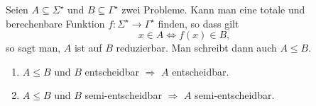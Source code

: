 Seien $A\subseteq \Sigma^\star$ und $B\subseteq \Gamma^\star$ zwei Probleme. Kann man eine totale und berechenbare Funktion $f:\Sigma^\star\rightarrow\Gamma^\star$ finden, so dass gilt
\begin{equation*}
	x\in A\Leftrightarrow f(x)\in B,
\end{equation*}
so sagt man, $A$ ist auf $B$ reduzierbar.
Man schreibt dann auch $A\leq B$.

\begin{enumerate}
	\item $A\leq B$ und $B$ entscheidbar $\Rightarrow$ $A$ entscheidbar.
	\item $A\leq B$ und $B$ semi-entscheidbar $\Rightarrow$ $A$ semi-entscheidbar.
\end{enumerate}
